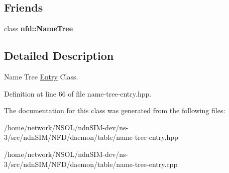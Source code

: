 \subsection*{Friends}
\begin{DoxyCompactItemize}
\item 
class {\bfseries nfd\+::\+Name\+Tree}\hypertarget{classnfd_1_1name__tree_1_1Entry_a6c9695e8b2951b18e0243f6b40a26735}{}\label{classnfd_1_1name__tree_1_1Entry_a6c9695e8b2951b18e0243f6b40a26735}

\end{DoxyCompactItemize}


\subsection{Detailed Description}
Name Tree \hyperlink{classnfd_1_1name__tree_1_1Entry}{Entry} Class. 

Definition at line 66 of file name-\/tree-\/entry.\+hpp.



The documentation for this class was generated from the following files\+:\begin{DoxyCompactItemize}
\item 
/home/network/\+N\+S\+O\+L/ndn\+S\+I\+M-\/dev/ns-\/3/src/ndn\+S\+I\+M/\+N\+F\+D/daemon/table/name-\/tree-\/entry.\+hpp\item 
/home/network/\+N\+S\+O\+L/ndn\+S\+I\+M-\/dev/ns-\/3/src/ndn\+S\+I\+M/\+N\+F\+D/daemon/table/name-\/tree-\/entry.\+cpp\end{DoxyCompactItemize}
